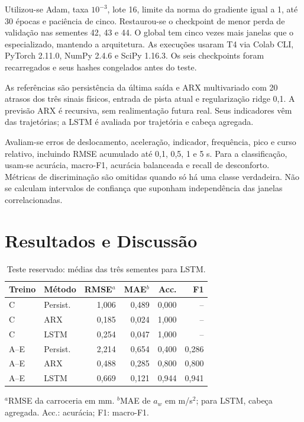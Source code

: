 \documentclass[conference]{IEEEtran}
\begin{document}
Utilizou-se Adam, taxa $10^{-3}$, lote 16, limite da norma do gradiente igual a 1, até 30 épocas e paciência de cinco. Restaurou-se o checkpoint de menor perda de validação nas sementes 42, 43 e 44. O global tem cinco vezes mais janelas que o especializado, mantendo a arquitetura. As execuções usaram T4 via Colab CLI, PyTorch 2.11.0, NumPy 2.4.6 e SciPy 1.16.3. Os seis checkpoints foram recarregados e seus hashes congelados antes do teste.

As referências são persistência da última saída e ARX multivariado com 20 atrasos dos três sinais físicos, entrada de pista atual e regularização ridge 0,1. A previsão ARX é recursiva, sem realimentação futura real. Seus indicadores vêm das trajetórias; a LSTM é avaliada por trajetória e cabeça agregada.

Avaliam-se erros de deslocamento, aceleração, indicador, frequência, pico e curso relativo, incluindo RMSE acumulado até 0,1, 0,5, 1 e 5 s. Para a classificação, usam-se acurácia, macro-F1, acurácia balanceada e recall de desconforto. Métricas de discriminação são omitidas quando só há uma classe verdadeira. Não se calculam intervalos de confiança que suponham independência das janelas correlacionadas.

\section{Resultados e Discussão}
\begin{table}[t]
\caption{Teste reservado: médias das três sementes para LSTM.}
\centering
\begin{tabular}{llrrrr}\toprule
Treino & Método & RMSE$^a$ & MAE$^b$ & Acc. & F1\\\midrule
C & Persist. & 1,006 & 0,489 & 0,000 & --\\
C & ARX & 0,185 & 0,024 & 1,000 & --\\
C & LSTM & 0,254 & 0,047 & 1,000 & --\\\midrule
A--E & Persist. & 2,214 & 0,654 & 0,400 & 0,286\\
A--E & ARX & 0,488 & 0,285 & 0,800 & 0,800\\
A--E & LSTM & 0,669 & 0,121 & 0,944 & 0,941\\\bottomrule
\end{tabular}
\vspace{2pt}
\parbox{\columnwidth}{\footnotesize $^a$RMSE da carroceria em mm. $^b$MAE de $a_w$ em m/s$^2$; para LSTM, cabeça agregada. Acc.: acurácia; F1: macro-F1.}
\label{tab:results}
\end{table}
\end{document}
